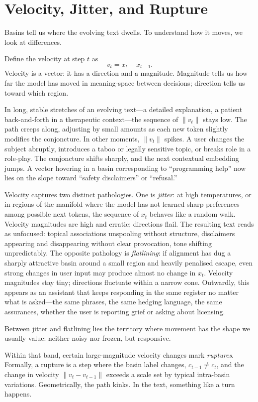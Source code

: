 \documentclass[12pt,a4paper]{report}
\begin{document}
\section{Velocity, Jitter, and Rupture}

Basins tell us where the evolving text dwells. To understand how it moves, we look at differences.

Define the velocity at step $t$ as
\[
v_t = x_t - x_{t-1}.
\]
Velocity is a vector: it has a direction and a magnitude. Magnitude tells us how far the model has moved in meaning-space between decisions; direction tells us toward which region.

In long, stable stretches of an evolving text---a detailed explanation, a patient back-and-forth in a therapeutic context---the sequence of $\|v_t\|$ stays low. The path creeps along, adjusting by small amounts as each new token slightly modifies the conjoncture. In other moments, $\|v_t\|$ spikes. A user changes the subject abruptly, introduces a taboo or legally sensitive topic, or breaks role in a role-play. The conjoncture shifts sharply, and the next contextual embedding jumps. A vector hovering in a basin corresponding to ``programming help'' now lies on the slope toward ``safety disclaimers'' or ``refusal.''

Velocity captures two distinct pathologies. One is \emph{jitter}: at high temperatures, or in regions of the manifold where the model has not learned sharp preferences among possible next tokens, the sequence of $x_t$ behaves like a random walk. Velocity magnitudes are high and erratic; directions flail. The resulting text reads as unfocused: topical associations unspooling without structure, disclaimers appearing and disappearing without clear provocation, tone shifting unpredictably. The opposite pathology is \emph{flatlining}: if alignment has dug a sharply attractive basin around a small region and heavily penalised escape, even strong changes in user input may produce almost no change in $x_t$. Velocity magnitudes stay tiny; directions fluctuate within a narrow cone. Outwardly, this appears as an assistant that keeps responding in the same register no matter what is asked---the same phrases, the same hedging language, the same assurances, whether the user is reporting grief or asking about licensing.

Between jitter and flatlining lies the territory where movement has the shape we usually value: neither noisy nor frozen, but responsive.

Within that band, certain large-magnitude velocity changes mark \emph{ruptures}. Formally, a rupture is a step where the basin label changes, $c_{t-1} \neq c_t$, and the change in velocity $\|v_t - v_{t-1}\|$ exceeds a scale set by typical intra-basin variations. Geometrically, the path kinks. In the text, something like a turn happens.
\end{document}
